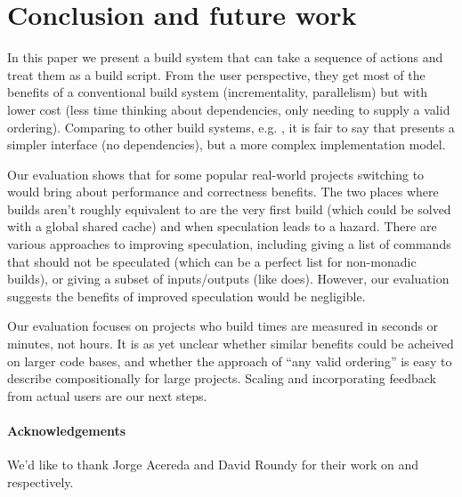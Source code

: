 \section{Conclusion and future work}
\label{sec:conclusion}

In this paper we present a build system that can take a sequence of actions and treat them as a build script. From the user perspective, they get most of the benefits of a conventional build system (incrementality, parallelism) but with lower cost (less time thinking about dependencies, only needing to supply a valid ordering). Comparing \Rattle to other build systems, e.g. \Make, it is fair to say that \Rattle presents a simpler interface (no dependencies), but a more complex implementation model.

Our evaluation shows that for some popular real-world projects switching to \Rattle would bring about performance and correctness benefits. The two places where builds aren't roughly equivalent to \Make are the very first build (which could be solved with a global shared cache) and when speculation leads to a hazard. There are various approaches to improving speculation, including giving a list of commands that should not be speculated (which can be a perfect list for non-monadic builds), or giving a subset of inputs/outputs (like \Fac does). However, our evaluation suggests the benefits of improved speculation would be negligible.

Our evaluation focuses on projects who build times are measured in seconds or minutes, not hours. It is as yet unclear whether similar benefits could be acheived on larger code bases, and whether the \Rattle approach of ``any valid ordering'' is easy to describe compositionally for large projects. Scaling \Rattle and incorporating feedback from actual users are our next steps.

\paragraph{Acknowledgements} We'd like to thank Jorge Acereda and David Roundy for their work on \Fsatrace and \Bigbro respectively.
